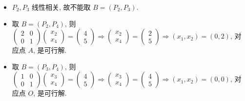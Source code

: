 \documentclass[8pt]{article}
\theoremstyle{compact}
\begin{document}
\begin{itemize}
	\item $P_2, P_3$ 线性相关, 故不能取 $B = (P_2, P_3)$.
	\item 取 $B = (P_2, P_4)$, 则 $\begin{pmatrix}2 & 0 \\ 0 & 1\end{pmatrix} \begin{pmatrix} x_2 \\ x_4 \end{pmatrix} = \begin{pmatrix} 4 \\ 5\end{pmatrix} \Rightarrow \begin{pmatrix} x_2 \\ x_4\end{pmatrix} = \begin{pmatrix} 2 \\ 5 \end{pmatrix} \Rightarrow (x_1, x_2) = (0, 2)$, 对应点 $A$, 是可行解.
	\item 取 $B = (P_3, P_4)$, 则 $\begin{pmatrix}1 & 0 \\ 0 & 1\end{pmatrix} \begin{pmatrix} x_3 \\ x_4 \end{pmatrix} = \begin{pmatrix} 4 \\ 5\end{pmatrix} \Rightarrow \begin{pmatrix} x_3 \\ x_4\end{pmatrix} = \begin{pmatrix} 4 \\ 5 \end{pmatrix} \Rightarrow (x_1, x_2) = (0, 0)$, 对应点 $O$, 是可行解.
\end{itemize}
\end{document}
